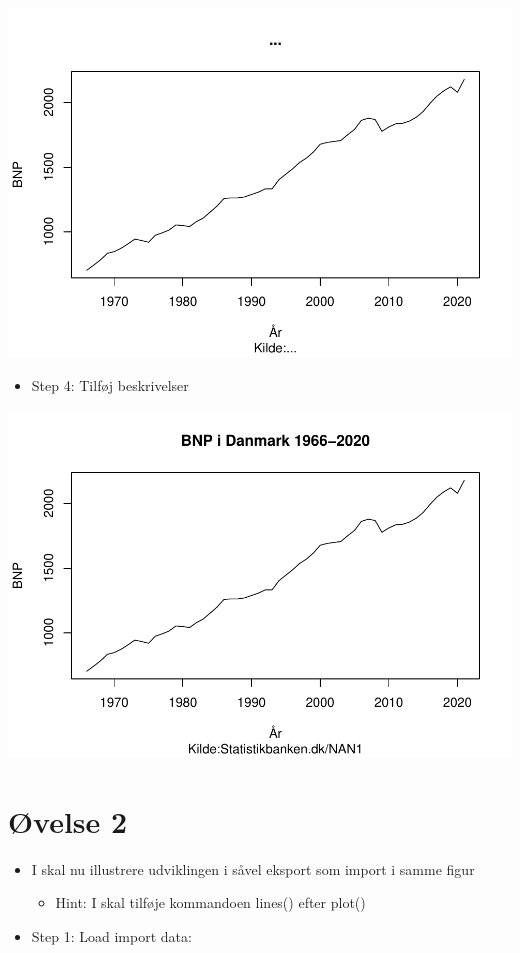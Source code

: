 \documentclass[
  12pt,
]{article}
\providecommand{\tightlist}{%
  \setlength{\itemsep}{0pt}\setlength{\parskip}{0pt}}
\begin{document}
\includegraphics{Rkursus_done_files/figure-latex/unnamed-chunk-7-1.pdf}

\begin{itemize}
\tightlist
\item
  Step 4: Tilføj beskrivelser
\end{itemize}

\includegraphics{Rkursus_done_files/figure-latex/unnamed-chunk-8-1.pdf}

\hypertarget{uxf8velse-2}{%
\section{Øvelse 2}\label{uxf8velse-2}}

\begin{itemize}
\tightlist
\item
  I skal nu illustrere udviklingen i såvel eksport som import i samme
  figur

  \begin{itemize}
  \tightlist
  \item
    Hint: I skal tilføje kommandoen lines() efter plot()
  \end{itemize}
\item
  Step 1: Load import data:
\end{itemize}
\end{document}
